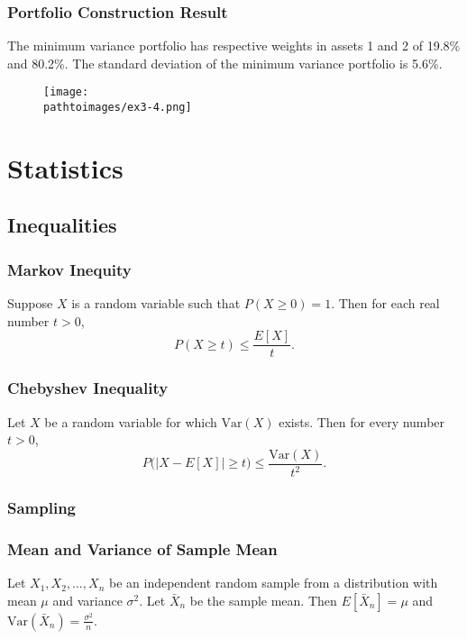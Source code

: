 \documentclass{beamer}
\newcommand{\pathtoimages}{/Users/charlesrambo/Desktop/Bootcamp24/Images}
\begin{document}
\begin{frame}
\frametitle{Portfolio Construction Result}
The minimum variance portfolio has respective weights in assets 1 and 2 of 19.8\% and 80.2\%. The standard deviation of the minimum variance portfolio is 5.6\%.
\begin{figure}
\centering
\texttt{[image: \\pathtoimages/ex3-4.png]}
\end{figure}
\end{frame}

\section{Statistics}



\subsection{Inequalities} 

\begin{frame}
\frametitle{Markov Inequity}

\begin{Theorem} 
Suppose $X$ is a random variable such that $P(X\geq 0) = 1$. Then for each real number $t > 0$,
$$
P(X\geq t) \leq \frac{E[X]}{t}.
$$
\end{Theorem}
\end{frame}

\begin{frame}
\frametitle{Chebyshev Inequality}

\begin{Theorem}
Let $X$ be a random variable for which $\text{Var}(X)$ exists. Then for every number $t > 0$,
$$
P\Big(\left| X - E[X]\right| \geq t\Big) \leq \frac{\text{Var}(X)}{t^2}.
$$
\end{Theorem}

\end{frame}

\frametitle{Sampling} 

\begin{frame}
\frametitle{Mean and Variance of Sample Mean}

\begin{Theorem}
Let $X_1, X_2,\ldots, X_n$ be an independent random sample from a distribution with mean $\mu$ and variance $\sigma^2$. Let $\bar{X}_n$ be the sample mean. Then $E[\bar{X}_n] = \mu$ and $\text{Var}(\bar{X}_n) =\frac{\sigma^2}{n}$.
\end{Theorem}
\end{frame}
\end{document}
